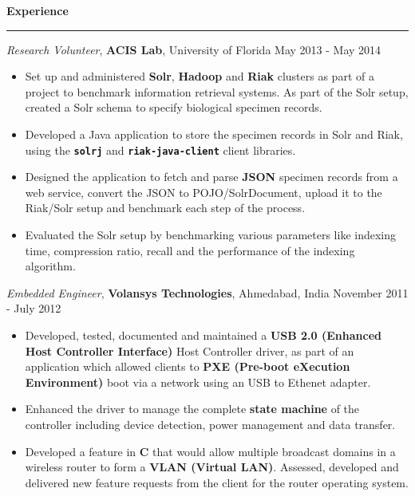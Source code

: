 \documentclass[10pt]{article}
\begin{document}
\textbf{Experience}
\smallskip
\hrule
\textit{Research Volunteer}, {\bf ACIS Lab}, University of Florida \hfill May 2013 - May 2014
\begin{itemize}
    \item Set up and administered \textbf{Solr}, \textbf{Hadoop} and \textbf{Riak} 
clusters as part of a project to benchmark information retrieval systems. As part of the Solr setup, created a Solr schema to specify biological specimen records.
    \item Developed a Java application to store the specimen records in Solr and Riak, using the \texttt{\bf solrj} and \texttt{\bf riak-java-client} client libraries.
    \item Designed the application to fetch and parse \textbf{JSON} specimen records from a web service, convert the JSON to POJO/SolrDocument, upload it to the Riak/Solr
setup and benchmark each step of the process.
    \item Evaluated the Solr setup by benchmarking various parameters like indexing time, compression ratio, recall and the performance of the indexing algorithm.
\end{itemize}

\textit{Embedded Engineer}, {\bf Volansys Technologies}, Ahmedabad, India \hfill November 2011 - July 2012
\begin{itemize}
    \item Developed, tested, documented and maintained a \textbf{USB 2.0 (Enhanced Host Controller Interface)} 
Host Controller driver, as part of an application which allowed clients to \textbf{PXE (Pre-boot eXecution Environment)} 
boot via a network using an USB to Ethenet adapter. 
    \item Enhanced the driver to manage the complete \textbf{state machine} of the controller 
including device detection, power management and data transfer. %
    \item Developed a feature in \textbf{C} that would allow multiple broadcast domains in a wireless 
router to form a \textbf{VLAN (Virtual LAN)}. Assessed, developed and delivered new feature requests from the 
client for the router operating system.
\end{itemize}
\end{document}
